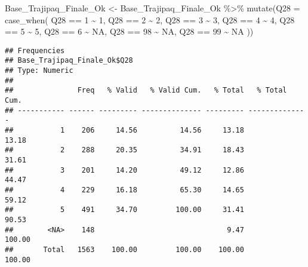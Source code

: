 \documentclass[
]{article}
\newenvironment{Shaded}{\begin{snugshade}}{\end{snugshade}}
\newcommand{\AttributeTok}[1]{\textcolor[rgb]{0.77,0.63,0.00}{#1}}
\newcommand{\ConstantTok}[1]{\textcolor[rgb]{0.00,0.00,0.00}{#1}}
\newcommand{\DecValTok}[1]{\textcolor[rgb]{0.00,0.00,0.81}{#1}}
\newcommand{\FunctionTok}[1]{\textcolor[rgb]{0.00,0.00,0.00}{#1}}
\newcommand{\NormalTok}[1]{#1}
\newcommand{\OtherTok}[1]{\textcolor[rgb]{0.56,0.35,0.01}{#1}}
\newcommand{\SpecialCharTok}[1]{\textcolor[rgb]{0.00,0.00,0.00}{#1}}
\begin{document}
\begin{Shaded}
\begin{Highlighting}[]
\NormalTok{Base\_Trajipaq\_Finale\_Ok }\OtherTok{\textless{}{-}}
\NormalTok{  Base\_Trajipaq\_Finale\_Ok }\SpecialCharTok{\%\textgreater{}\%}
  \FunctionTok{mutate}\NormalTok{(}\AttributeTok{Q28 =} \FunctionTok{case\_when}\NormalTok{(}
\NormalTok{    Q28 }\SpecialCharTok{==} \DecValTok{1} \SpecialCharTok{\textasciitilde{}} \DecValTok{1}\NormalTok{,}
\NormalTok{    Q28 }\SpecialCharTok{==} \DecValTok{2} \SpecialCharTok{\textasciitilde{}} \DecValTok{2}\NormalTok{,}
\NormalTok{    Q28 }\SpecialCharTok{==} \DecValTok{3} \SpecialCharTok{\textasciitilde{}} \DecValTok{3}\NormalTok{,}
\NormalTok{    Q28 }\SpecialCharTok{==} \DecValTok{4} \SpecialCharTok{\textasciitilde{}} \DecValTok{4}\NormalTok{,}
\NormalTok{    Q28 }\SpecialCharTok{==} \DecValTok{5} \SpecialCharTok{\textasciitilde{}} \DecValTok{5}\NormalTok{,}
\NormalTok{    Q28 }\SpecialCharTok{==} \DecValTok{6} \SpecialCharTok{\textasciitilde{}} \ConstantTok{NA}\NormalTok{,}
\NormalTok{    Q28 }\SpecialCharTok{==} \DecValTok{98} \SpecialCharTok{\textasciitilde{}} \ConstantTok{NA}\NormalTok{,}
\NormalTok{    Q28 }\SpecialCharTok{==} \DecValTok{99} \SpecialCharTok{\textasciitilde{}} \ConstantTok{NA}
\NormalTok{  ))}
\end{Highlighting}
\end{Shaded}

\begin{Shaded}
\end{Shaded}

\begin{verbatim}
## Frequencies  
## Base_Trajipaq_Finale_Ok$Q28  
## Type: Numeric  
## 
##               Freq   % Valid   % Valid Cum.   % Total   % Total Cum.
## ----------- ------ --------- -------------- --------- --------------
##           1    206     14.56          14.56     13.18          13.18
##           2    288     20.35          34.91     18.43          31.61
##           3    201     14.20          49.12     12.86          44.47
##           4    229     16.18          65.30     14.65          59.12
##           5    491     34.70         100.00     31.41          90.53
##        <NA>    148                               9.47         100.00
##       Total   1563    100.00         100.00    100.00         100.00
\end{verbatim}
\end{document}
